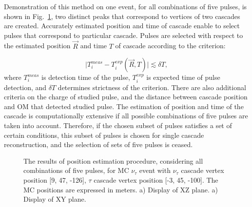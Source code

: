 \documentclass[a4paper,11pt]{article}
\begin{document}
 Demonstration of this method on one event, for all combinations of five pulses, is shown in Fig.~\ref{fig:set_of_five_demonstration}, two distinct peaks that correspond to vertices of two cascades are created. Accurately estimated position and time of cascade enable to select pulses that correspond to particular cascade. Pulses are selected with respect to the estimated position $\vec{R}$ and time $T$ of cascade according to the criterion: 

\begin{equation}
\mid T^{meas}_{i}-T^{exp}_{i}(\vec{R},T) \mid \lesssim \delta T,
\label{eq:tfilter}
\end{equation}
where $T^{meas}_{i}$ is detection time of the pulse, $T^{exp}_{i}$ is expected time of pulse detection, and $\delta T$ determines strictness of the criterion. There are also additional criteria on the charge of studied pulse, and the distance between cascade position and OM that detected studied pulse. The estimation of position and time of the cascade is computationally extensive if all possible combinations of five pulses are taken into account.  Therefore, if the chosen subset of pulses satisfies a set of certain conditions, this subset of pulses is chosen for single cascade reconstruction, and the selection of sets of five pulses is ceased.
\begin{figure}[h!]
	\centering
	\begin{multicols}{2}
		\centering
	\end{multicols}
	\caption{The results of position estimation procedure, considering all combinations of five pulses, for MC $\nu_{\tau}$ event with $\nu_{\tau}$ cascade vertex position [9, 47, -126], $\tau$ cascade vertex position [-3, 45, -100]. The MC positions are expressed in meters. a) Display of XZ plane. a) Display of XY plane.}
	\label{fig:set_of_five_demonstration}
\end{figure}
\end{document}
